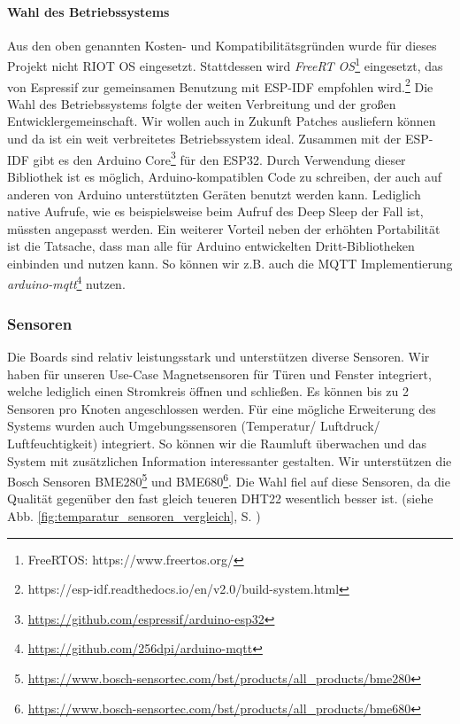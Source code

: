 \documentclass[a4paper,10pt,twocolumn]{article}
\begin{document}
\paragraph{Wahl des Betriebssystems} Aus den oben genannten Kosten- und Kompatibilitätsgründen wurde für dieses Projekt nicht RIOT OS eingesetzt. Stattdessen wird \textit{FreeRT OS}\footnote{FreeRTOS: https://www.freertos.org/} eingesetzt, das von Espressif zur gemeinsamen Benutzung mit \ac{ESP-IDF} empfohlen wird.\footnote{https://esp-idf.readthedocs.io/en/v2.0/build-system.html}
Die Wahl des Betriebssystems folgte der weiten Verbreitung und der großen Entwicklergemeinschaft. Wir wollen auch in Zukunft Patches ausliefern können und da ist ein weit verbreitetes Betriebssystem ideal. Zusammen mit der \ac{ESP-IDF} gibt es den Arduino Core\footnote{\url{https://github.com/espressif/arduino-esp32}} für den ESP32. Durch Verwendung dieser Bibliothek ist es möglich, Arduino-kompatiblen Code zu schreiben, der auch auf anderen von Arduino unterstützten Geräten benutzt werden kann. Lediglich native Aufrufe, wie es beispielsweise beim Aufruf des Deep Sleep der Fall ist, müssten angepasst werden. Ein weiterer Vorteil neben der erhöhten Portabilität ist die Tatsache, dass man alle für Arduino entwickelten Dritt-Bibliotheken einbinden und nutzen kann. So können wir z.B. auch die MQTT Implementierung \textit{arduino-mqtt}\footnote{\url{https://github.com/256dpi/arduino-mqtt}} nutzen.

\subsubsection{Sensoren} 
Die Boards sind relativ leistungsstark und unterstützen diverse Sensoren. Wir haben für unseren Use-Case Magnetsensoren für Türen und Fenster integriert, welche lediglich einen Stromkreis öffnen und schließen. Es können bis zu 2 Sensoren pro Knoten angeschlossen werden. Für eine mögliche Erweiterung des Systems wurden auch Umgebungssensoren (Temperatur/ Luftdruck/ Luftfeuchtigkeit) integriert. So können wir die Raumluft überwachen und das System mit zusätzlichen Information interessanter gestalten. Wir unterstützen die Bosch Sensoren BME280\footnote{\url{https://www.bosch-sensortec.com/bst/products/all\_products/bme280}} und BME680\footnote{\url{https://www.bosch-sensortec.com/bst/products/all\_products/bme680}}. Die Wahl fiel auf diese Sensoren, da die Qualität gegenüber den fast gleich teueren DHT22 wesentlich besser ist.
(siehe Abb. \ref{fig:temparatur_sensoren_vergleich}, S. \pageref{fig:temparatur_sensoren_vergleich})
 
\end{document}
